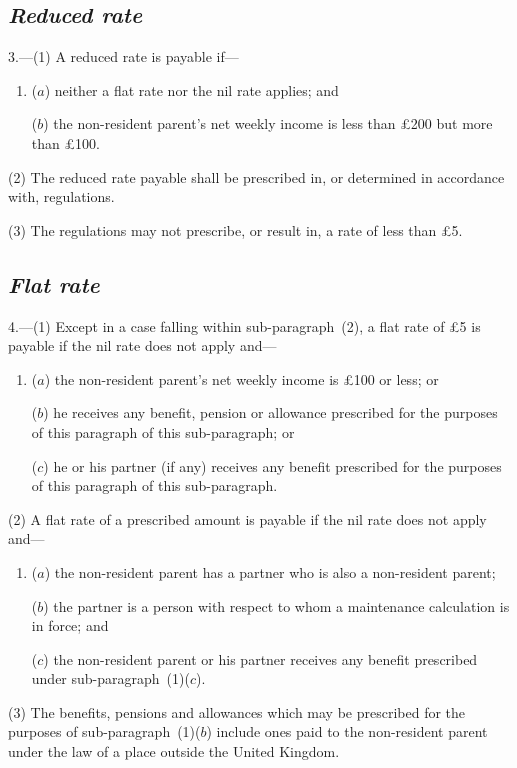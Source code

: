 \documentclass[12pt,a4paper]{article}
\begin{document}
\subsection*{\itshape Reduced rate}

3.---(1) A reduced rate is payable if—
\begin{enumerate}\item[]
($a$) neither a flat rate nor the nil rate applies; and

($b$) the non-resident parent’s net weekly income is less than £200 but more than £100. 
\end{enumerate}

(2) The reduced rate payable shall be prescribed in, or determined in accordance with, regulations.

(3) The regulations may not prescribe, or result in, a rate of less than £5. 

\subsection*{\itshape Flat rate}

4.---(1) Except in a case falling within sub-paragraph~(2), a flat rate of £5 is payable if the nil rate does not apply and—
\begin{enumerate}\item[]
($a$) the non-resident parent’s net weekly income is £100 or less; or

($b$) he receives any benefit, pension or allowance prescribed for the purposes of this paragraph of this sub-paragraph; or

($c$) he or his partner (if any) receives any benefit prescribed for the purposes of this paragraph of this sub-paragraph.
\end{enumerate}

(2) A flat rate of a prescribed amount is payable if the nil rate does not apply and—
\begin{enumerate}\item[]
($a$) the non-resident parent has a partner who is also a non-resident parent;

($b$) the partner is a person with respect to whom a maintenance calculation is in force; and

($c$) the non-resident parent or his partner receives any benefit prescribed under sub-paragraph~(1)($c$).
\end{enumerate}

(3) The benefits, pensions and allowances which may be prescribed for the purposes of sub-paragraph~(1)($b$)  include ones paid to the non-resident parent under the law of a place outside the United Kingdom.
\end{document}
